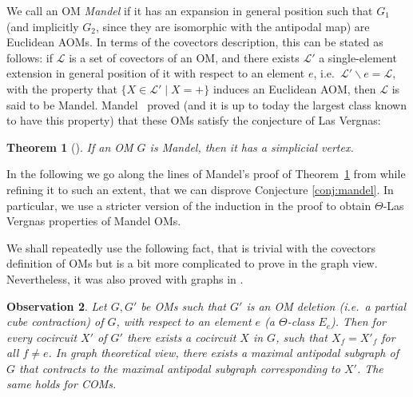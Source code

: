 \documentclass[final,11pt]{article}
\newtheorem{thm}{Theorem}[section]
\newtheorem{obs}[thm]{Observation}
\newcommand{\covectors}{\ensuremath{\mathcal{L}}}
\begin{document}
We call an OM \emph{Mandel} if it has an expansion in general position such that $G_1$ (and implicitly $G_2$, since they are isomorphic with the antipodal map) are Euclidean AOMs. In terms of the covectors description, this can be stated as follows: if $\covectors$ is a set of covectors of an OM, and there exists $\covectors'$ a single-element extension in general position of it with respect to an element $e$, i.e.~$\covectors'\backslash e = \covectors$, with the property that $\{X \in \covectors' \mid X=+\}$ induces an Euclidean AOM, then $\covectors$ is said to be Mandel.
 Mandel~\cite[Theorem 7]{Man-82} proved (and it is up to today the largest class known to have this property) that these OMs satisfy the conjecture of Las Vergnas:


\begin{thm}[\cite{Man-82}]\label{thm:mandel}
 If an OM $G$ is Mandel, then it has a simplicial vertex.
\end{thm}


In the following we go along the lines of Mandel's proof of Theorem~\ref{thm:mandel} from \cite{Man-82} while refining it to such an extent, that we can disprove Conjecture \ref{conj:mandel}. In particular, we use a stricter version of the induction in the proof to obtain $\Theta$-Las Vergnas properties of Mandel OMs.

We shall repeatedly use the following fact, that is trivial with the covectors definition of OMs but is a bit more complicated to prove in the graph view. Nevertheless, it was also proved with graphs in \cite[Lemma 6.2]{Kna-17}.

\begin{obs}\label{lem:exp_antipodal}
Let $G, G'$ be OMs such that $G'$ is an OM deletion (i.e.~a partial cube contraction) of $G$, with respect to an element $e$ (a $\Theta$-class $E_e$). Then for every cocircuit $X'$ of $G'$ there exists a cocircuit $X$ in $G$, such that $X_f=X'_f$ for all $f\neq e$. In graph theoretical view, there exists a maximal antipodal subgraph of $G$ that contracts to the maximal antipodal subgraph corresponding to $X'$. The same holds for COMs.
\end{obs}  
\end{document}
